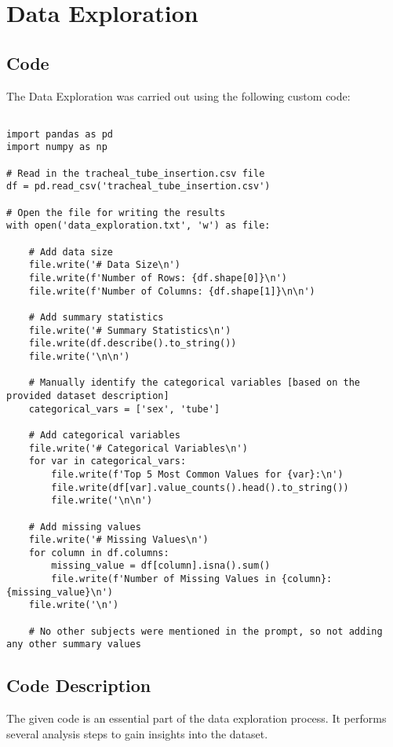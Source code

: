 \documentclass[11pt]{article}
\begin{document}
\section{Data Exploration}
\subsection{{Code}}
The Data Exploration was carried out using the following custom code:

\begin{verbatim}

import pandas as pd
import numpy as np

# Read in the tracheal_tube_insertion.csv file
df = pd.read_csv('tracheal_tube_insertion.csv')

# Open the file for writing the results
with open('data_exploration.txt', 'w') as file:

    # Add data size
    file.write('# Data Size\n')
    file.write(f'Number of Rows: {df.shape[0]}\n')
    file.write(f'Number of Columns: {df.shape[1]}\n\n')

    # Add summary statistics
    file.write('# Summary Statistics\n')
    file.write(df.describe().to_string())
    file.write('\n\n')

    # Manually identify the categorical variables [based on the provided dataset description]
    categorical_vars = ['sex', 'tube']

    # Add categorical variables
    file.write('# Categorical Variables\n')
    for var in categorical_vars:
        file.write(f'Top 5 Most Common Values for {var}:\n')
        file.write(df[var].value_counts().head().to_string())
        file.write('\n\n')

    # Add missing values
    file.write('# Missing Values\n')
    for column in df.columns:
        missing_value = df[column].isna().sum()
        file.write(f'Number of Missing Values in {column}: {missing_value}\n')
    file.write('\n')

    # No other subjects were mentioned in the prompt, so not adding any other summary values

\end{verbatim}

\subsection{Code Description}

The given code is an essential part of the data exploration process. It performs several analysis steps to gain insights into the dataset. 
\end{document}
